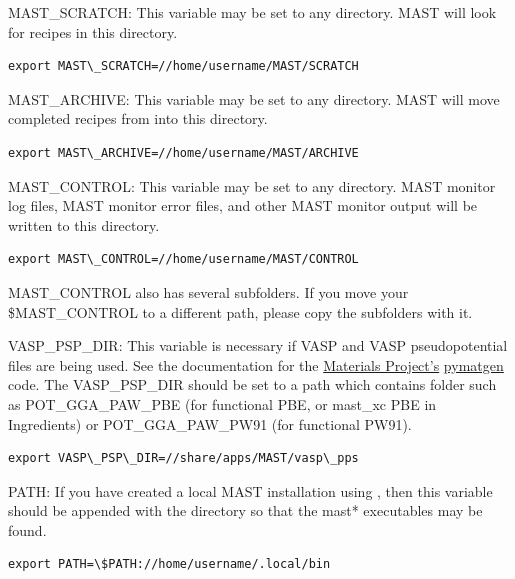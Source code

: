 \documentclass[letterpaper,10pt,english]{sphinxmanual}
\begin{document}
MAST\_SCRATCH: This variable may be set to any directory. MAST will look for recipes in this directory.

\begin{Verbatim}[commandchars=\\\{\}]
export MAST\_SCRATCH=//home/username/MAST/SCRATCH
\end{Verbatim}

MAST\_ARCHIVE: This variable may be set to any directory. MAST will move completed recipes from  into this directory.

\begin{Verbatim}[commandchars=\\\{\}]
export MAST\_ARCHIVE=//home/username/MAST/ARCHIVE
\end{Verbatim}

MAST\_CONTROL: This variable may be set to any directory. MAST monitor log files, MAST monitor error files, and other MAST monitor output will be written to this directory.

\begin{Verbatim}[commandchars=\\\{\}]
export MAST\_CONTROL=//home/username/MAST/CONTROL
\end{Verbatim}

MAST\_CONTROL also has several subfolders. If you move your \$MAST\_CONTROL to a different path, please copy the subfolders with it.

VASP\_PSP\_DIR: This variable is necessary if VASP and VASP pseudopotential files are being used. See the documentation for the \href{http://materialsproject.org}{Materials Project's} \href{http://pymatgen.org}{pymatgen} code. The VASP\_PSP\_DIR should be set to a path which contains folder such as POT\_GGA\_PAW\_PBE (for functional PBE, or mast\_xc PBE in Ingredients) or POT\_GGA\_PAW\_PW91 (for functional PW91).

\begin{Verbatim}[commandchars=\\\{\}]
export VASP\_PSP\_DIR=//share/apps/MAST/vasp\_pps
\end{Verbatim}

PATH: If you have created a local MAST installation using , then this variable should be appended with the  directory so that the mast* executables may be found.

\begin{Verbatim}[commandchars=\\\{\}]
export PATH=\$PATH://home/username/.local/bin
\end{Verbatim}
\end{document}
